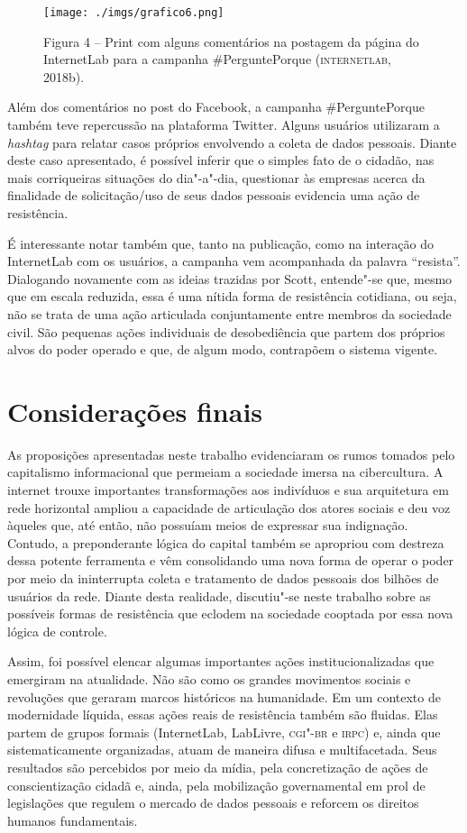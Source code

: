\begin{figure}[!ht]
\texttt{[image: ./imgs/grafico6.png]}
\caption{Figura 4 -- Print com alguns comentários na postagem da página do InternetLab para a campanha \#PerguntePorque (\textsc{internetlab}, 2018b).}
 \end{figure}

Além dos comentários no post do Facebook, a campanha \#PerguntePorque
também teve repercussão na plataforma Twitter. Alguns usuários
utilizaram a \emph{hashtag} para relatar casos próprios envolvendo a
coleta de dados pessoais. Diante deste caso apresentado, é possível
inferir que o simples fato de o cidadão, nas mais corriqueiras situações
do dia"-a"-dia, questionar às empresas acerca da finalidade de
solicitação/uso de seus dados pessoais evidencia uma ação de
resistência.

É interessante notar também que, tanto na publicação, como na interação
do InternetLab com os usuários, a campanha vem acompanhada da palavra
``resista''. Dialogando novamente com as ideias trazidas por Scott,
entende"-se que, mesmo que em escala reduzida, essa é uma nítida forma de
resistência cotidiana, ou seja, não se trata de uma ação articulada
conjuntamente entre membros da sociedade civil. São pequenas ações
individuais de desobediência que partem dos próprios alvos do poder
operado e que, de algum modo, contrapõem o sistema vigente.

\section{Considerações finais}

\noindent{}As proposições apresentadas neste trabalho evidenciaram os rumos tomados
pelo capitalismo informacional que permeiam a sociedade imersa na
cibercultura. A internet trouxe importantes transformações aos
indivíduos e sua arquitetura em rede horizontal ampliou a capacidade de
articulação dos atores sociais e deu voz àqueles que, até então, não
possuíam meios de expressar sua indignação. Contudo, a preponderante
lógica do capital também se apropriou com destreza dessa potente
ferramenta e vêm consolidando uma nova forma de operar o poder por meio
da ininterrupta coleta e tratamento de dados pessoais dos bilhões de
usuários da rede. Diante desta realidade, discutiu"-se neste trabalho
sobre as possíveis formas de resistência que eclodem na sociedade
cooptada por essa nova lógica de controle.

Assim, foi possível elencar algumas importantes ações
institucionalizadas que emergiram na atualidade. Não são como os grandes
movimentos sociais e revoluções que geraram marcos históricos na
humanidade. Em um contexto de modernidade líquida, essas ações reais de
resistência também são fluidas. Elas partem de grupos formais
(InternetLab, LabLivre, \textsc{cgi"-br} e \textsc{irpc}) e, ainda que sistematicamente
organizadas, atuam de maneira difusa e multifacetada. Seus resultados
são percebidos por meio da mídia, pela concretização de ações de
conscientização cidadã e, ainda, pela mobilização governamental em prol
de legislações que regulem o mercado de dados pessoais e reforcem os
direitos humanos fundamentais.

